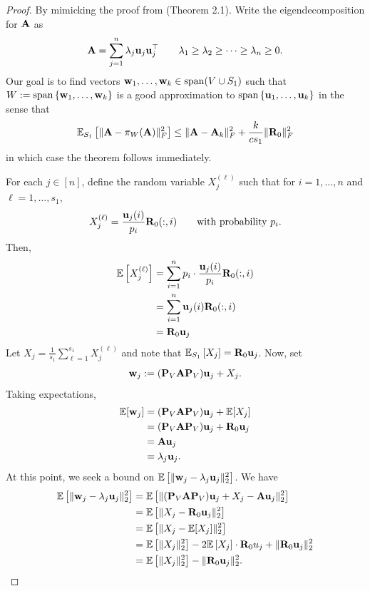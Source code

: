 \documentclass{article}
\begin{document}
\begin{proof}
    By mimicking the proof from \cite{deshpande_matrix_2006} (Theorem 2.1). Write the eigendecomposition for $\mathbf{A}$ as
    \[\mathbf{A} = \sum_{j = 1}^n\lambda_j \mathbf{u}_j\mathbf{u}_j^\top\qquad \lambda_1 \geq \lambda_2\geq \cdots\geq \lambda_n\geq 0.\]
    Our goal is to find vectors $\mathbf{w}_1, \ldots, \mathbf{w}_k \in \operatorname*{span}(V\cup S_1)$ such that $W := \operatorname*{span}\left\{\mathbf{w}_1,\ldots, \mathbf{w}_k\right\}$ is a good approximation to $\operatorname*{span}\left\{\mathbf{u}_1,\ldots, \mathbf{u}_k\right\}$ in the sense that 
    \[\mathbb{E}_{S_1}\left[\|\mathbf{A} - \pi_W(\mathbf{A})\|^2_F\right]\leq \|\mathbf{A} - \mathbf{A}_k\|^2_F + \frac{k}{cs_1}\|\mathbf{R}_0\|^2_F\]
    in which case the theorem follows immediately.
    
    For each $j\in [n]$, define the random variable $X_j^{(\ell)}$ such that for $i = 1,\ldots, n$ and $\ell = 1,\ldots, s_1$, 
    \[X_j^{(\ell)} = \frac{\mathbf{u}_j(i)}{p_i}\mathbf{R}_0(:, i)\qquad\text{with probability $p_i$.}\]
    Then,
    \begin{align*}
        \mathbb{E}\left[X_j^{(\ell)}\right] &= \sum_{i = 1}^n p_i\cdot \frac{\mathbf{u}_j(i)}{p_i}\mathbf{R}_0(:, i)\\
        &= \sum_{i = 1}^n \mathbf{u}_j(i)\mathbf{R}_0(:, i)\\
        &= \mathbf{R}_0 \mathbf{u}_j
    \end{align*}
    Let $X_j = \frac{1}{s_1}\sum_{\ell = 1}^{s_1} X_j^{(\ell)}$ and note that $\mathbb{E}_{S_1}\left[X_j\right] = \mathbf{R}_0 \mathbf{u}_j$. Now, set 
    \[\mathbf{w}_j := (\mathbf{P}_V\mathbf{A}\mathbf{P}_V)\mathbf{u}_j + X_j.\]
    Taking expectations,
    \begin{align*}
        \mathbb{E}[\mathbf{w}_j] &= (\mathbf{P}_V\mathbf{A}\mathbf{P}_V)\mathbf{u}_j + \mathbb{E}[X_j]\\
        &= (\mathbf{P}_V\mathbf{A}\mathbf{P}_V)\mathbf{u}_j + \mathbf{R}_0\mathbf{u}_j\\
        &= \mathbf{A}\mathbf{u}_j\\
        &= \lambda_j\mathbf{u}_j.
    \end{align*}
    At this point, we seek a bound on $\mathbb{E}\left[\|\mathbf{w}_j - \lambda_j\mathbf{u}_j\|^2_2\right]$. We have
    \begin{align*}
         \E\left[\|\bw_j - \lambda_j\bu_j\|^2_2\right] &= \E\left[\|(\bP_V\bA\bP_V)\bu_j + X_j - \bA\bu_j\|^2_2\right]\\
         &= \E\left[\|X_j - \bR_0\bu_j\|^2_2\right]\\
         &= \E\left[\|X_j - \E[X_j]\|^2_2\right]\\
         &= \E\left[\|X_j\|^2_2\right] - 2 \E\left[X_j\right]\cdot \bR_0u_j + \|\bR_0\bu_j\|^2_2\\
         &= \E\left[\|X_j\|^2_2\right] -  \|\bR_0\bu_j\|^2_2.\\

\end{align*}
\end{proof}
\end{document}
